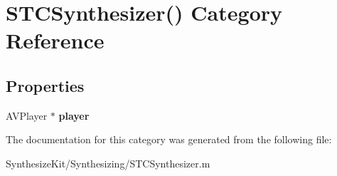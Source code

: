 \hypertarget{category_s_t_c_synthesizer_07_08}{}\section{S\+T\+C\+Synthesizer() Category Reference}
\label{category_s_t_c_synthesizer_07_08}
\subsection*{Properties}
\begin{DoxyCompactItemize}
\item 
\hypertarget{category_s_t_c_synthesizer_07_08_a9ad1f565e550a719fb4318fbbb8a0dec}{}\label{category_s_t_c_synthesizer_07_08_a9ad1f565e550a719fb4318fbbb8a0dec} 
A\+V\+Player $\ast$ {\bfseries player}
\end{DoxyCompactItemize}


The documentation for this category was generated from the following file\+:\begin{DoxyCompactItemize}
\item 
Synthesize\+Kit/\+Synthesizing/S\+T\+C\+Synthesizer.\+m\end{DoxyCompactItemize}
